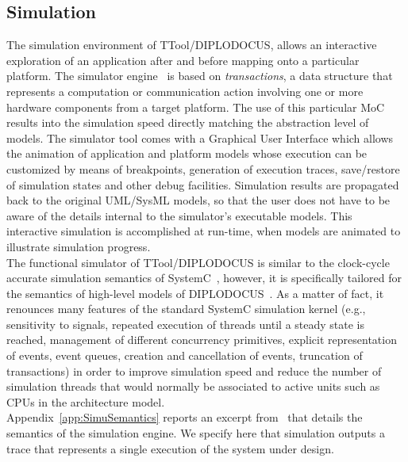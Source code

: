 \documentclass{llncs}
\begin{document}
\subsection{Simulation}
\label{subsec:Simulation}
%
The simulation environment of TTool/DIPLODOCUS, allows an interactive exploration of an application after and before
mapping onto a particular platform. The simulator engine~\cite{Knorreck09} is based on \textit{transactions}, a data
structure that represents a computation or communication action involving one or more hardware components from a target
platform. The use of this particular MoC results into the simulation speed directly matching the abstraction level of
models. The simulator tool comes with a Graphical User Interface which allows the animation of application and platform
models whose execution can be customized by means of breakpoints, generation of execution traces, save/restore of
simulation states and other debug facilities. Simulation results are propagated back to the original UML/SysML models,
so that the user does not have to be aware of the details internal to the simulator’s executable models. This
interactive simulation is accomplished at run-time, when models are animated to illustrate simulation progress.\\
%
The functional simulator of TTool/DIPLODOCUS is similar to the clock-cycle accurate simulation semantics of
SystemC~\cite{SystemCSimulationSemantics}, however, it is specifically tailored for the semantics of high-level models
of DIPLODOCUS~\cite{Knorreck09}. As a matter of fact, it renounces many features of the standard SystemC simulation
kernel (e.g., sensitivity to signals, repeated execution of threads until a steady state is reached, management of
different concurrency primitives, explicit representation of events, event queues, creation and cancellation of events,
truncation of transactions) in order to improve simulation speed and reduce the number of simulation threads that
would normally be associated to active units such as CPUs in the architecture model.\\
%
Appendix~\ref{app:SimuSemantics} reports an excerpt from~\cite{Knorreck11} that details the semantics of the simulation
engine. We specify here that simulation outputs a trace that represents a single execution of the system under design.\\
%
\end{document}
